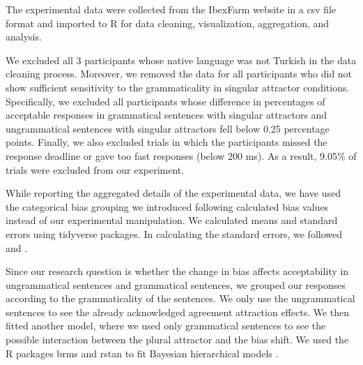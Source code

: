 The experimental data were collected from the IbexFarm website in a csv file format and imported to R for data cleaning, visualization, aggregation, and analysis. 

We excluded all 3 participants whose native language was not Turkish in the data cleaning process. Moreover, we removed the data for all participants who did not show sufficient sensitivity to the grammaticality in singular attractor conditions. Specifically, we excluded all participants whose difference in percentages of acceptable responses in grammatical sentences with singular attractors and ungrammatical sentences with singular attractors fell below 0.25 percentage points. Finally, we also excluded trials in which the participants missed the response deadline or gave too fast responses (below 200 ms). As a result, 9.05\% of trials were excluded from our experiment. 


  






While reporting the aggregated details of the experimental data, we have used the categorical bias grouping we introduced following calculated bias values instead of our experimental manipulation. We calculated means and standard errors using tidyverse packages. In calculating the standard errors, we followed  and . 


Since our research question is whether the change in bias affects acceptability in ungrammatical sentences and grammatical sentences, we grouped our responses according to the grammaticality of the sentences. We only use the ungrammatical sentences to see the already acknowledged agreement attraction effects. We then fitted another model, where we used only grammatical sentences to see the possible interaction between the plural attractor and the bias shift. We used the R packages brms \citep{R-brms_a,R-brms_b} and rstan \citep{R-rstan} to fit Bayesian hierarchical models \citep[e.g.,][]{GelmanHill:2007,NicenboimVasishth:2016}.

